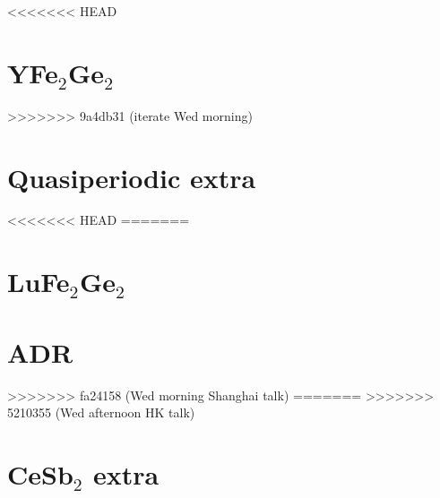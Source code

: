 % 
% 
% 
% 
%

%
%



<<<<<<< HEAD
\section{YFe$_2$Ge$_2$}
>>>>>>> 9a4db31 (iterate Wed morning)





\section{Quasiperiodic extra}


%
%




<<<<<<< HEAD
=======
\section{LuFe$_2$Ge$_2$}

% 
\section{ADR}

>>>>>>> fa24158 (Wed morning Shanghai talk)
=======
>>>>>>> 5210355 (Wed afternoon HK talk)

\section{CeSb$_2$ extra}





